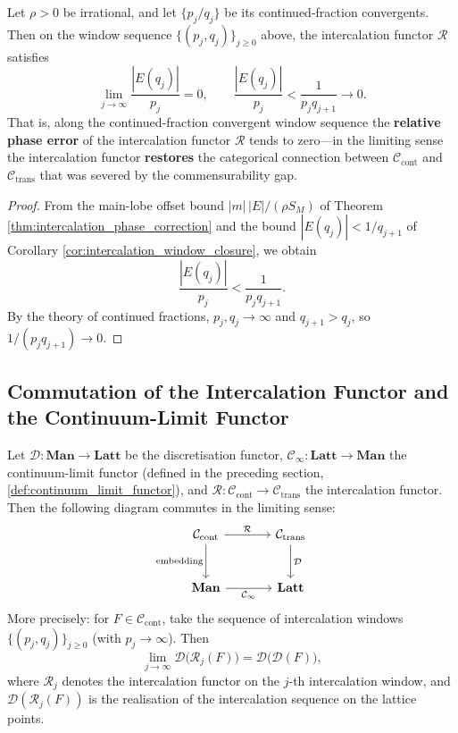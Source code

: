 \begin{theorem}\label{thm:intercalation_continued_fraction}
Let $\rho>0$ be irrational, and let $\{p_j/q_j\}$ be its continued-fraction convergents. Then on the window sequence $\{(p_j,q_j)\}_{j\ge 0}$ above, the intercalation functor $\mathcal{R}$ satisfies
\[
\lim_{j\to\infty}\frac{|E(q_j)|}{p_j}=0,\qquad
\frac{|E(q_j)|}{p_j}<\frac{1}{p_j q_{j+1}}\to 0.
\]
That is, along the continued-fraction convergent window sequence the \textbf{relative phase error} of the intercalation functor $\mathcal{R}$ tends to zero---in the limiting sense the intercalation functor \textbf{restores} the categorical connection between $\mathcal{C}_{\text{cont}}$ and $\mathcal{C}_{\text{trans}}$ that was severed by the commensurability gap.
\end{theorem}

\begin{proof}
From the main-lobe offset bound $|m|\,|E|/(\rho S_M)$ of Theorem \ref{thm:intercalation_phase_correction} and the bound $|E(q_j)|<1/q_{j+1}$ of Corollary \ref{cor:intercalation_window_closure}, we obtain
\[
\frac{|E(q_j)|}{p_j}<\frac{1}{p_j q_{j+1}}.
\]
By the theory of continued fractions, $p_j,q_j\to\infty$ and $q_{j+1}>q_j$, so $1/(p_j q_{j+1})\to 0$.
\end{proof}

\subsection{Commutation of the Intercalation Functor and the Continuum-Limit Functor}

\begin{theorem}\label{thm:intercalation_continuum_commutation}
Let $\mathcal{D}:\mathbf{Man}\to\mathbf{Latt}$ be the discretisation functor, $\mathcal{C}_\infty:\mathbf{Latt}\to\mathbf{Man}$ the continuum-limit functor (defined in the preceding section, \ref{def:continuum_limit_functor}), and $\mathcal{R}:\mathcal{C}_{\text{cont}}\to\mathcal{C}_{\text{trans}}$ the intercalation functor. Then the following diagram commutes in the limiting sense:
\[
\begin{tikzcd}[row sep=large, column sep=large]
\mathcal{C}_{\text{cont}} \arrow[r, "\mathcal{R}"] \arrow[d, "\text{embedding}"'] & \mathcal{C}_{\text{trans}} \arrow[d, "\mathcal{D}"] \\
\mathbf{Man} \arrow[r, "\mathcal{C}_\infty"'] & \mathbf{Latt}
\end{tikzcd}
\]
More precisely: for $F\in\mathcal{C}_{\text{cont}}$, take the sequence of intercalation windows $\{(p_j,q_j)\}_{j\ge 0}$ (with $p_j\to\infty$). Then
\[
\lim_{j\to\infty}\mathcal{D}\big(\mathcal{R}_j(F)\big)=\mathcal{D}\big(\mathcal{D}(F)\big),
\]
where $\mathcal{R}_j$ denotes the intercalation functor on the $j$-th intercalation window, and $\mathcal{D}(\mathcal{R}_j(F))$ is the realisation of the intercalation sequence on the lattice points.
\end{theorem}

